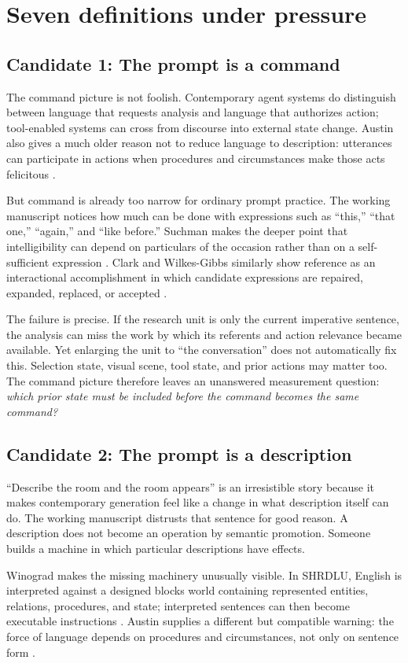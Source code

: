 \documentclass[11pt]{article}
\newcommand{\candidate}[1]{\subsection*{Candidate #1}}
\begin{document}
\section{Seven definitions under pressure}

\candidate{1: The prompt is a command}
The command picture is not foolish. Contemporary agent systems do distinguish between language that requests analysis and language that authorizes action; tool-enabled systems can cross from discourse into external state change. Austin also gives a much older reason not to reduce language to description: utterances can participate in actions when procedures and circumstances make those acts felicitous \parencite{austin1962how}.

But command is already too narrow for ordinary prompt practice. The working manuscript notices how much can be done with expressions such as “this,” “that one,” “again,” and “like before.” Suchman makes the deeper point that intelligibility can depend on particulars of the occasion rather than on a self-sufficient expression \parencite{suchman1985plans}. Clark and Wilkes-Gibbs similarly show reference as an interactional accomplishment in which candidate expressions are repaired, expanded, replaced, or accepted \parencite{clarkwilkesgibbs1986}.

The failure is precise. If the research unit is only the current imperative sentence, the analysis can miss the work by which its referents and action relevance became available. Yet enlarging the unit to “the conversation” does not automatically fix this. Selection state, visual scene, tool state, and prior actions may matter too. The command picture therefore leaves an unanswered measurement question: \emph{which prior state must be included before the command becomes the same command?}

\candidate{2: The prompt is a description}
“Describe the room and the room appears” is an irresistible story because it makes contemporary generation feel like a change in what description itself can do. The working manuscript distrusts that sentence for good reason. A description does not become an operation by semantic promotion. Someone builds a machine in which particular descriptions have effects.

Winograd makes the missing machinery unusually visible. In SHRDLU, English is interpreted against a designed blocks world containing represented entities, relations, procedures, and state; interpreted sentences can then become executable instructions \parencite{winograd1973procedural}. Austin supplies a different but compatible warning: the force of language depends on procedures and circumstances, not only on sentence form \parencite{austin1962how}.
\end{document}

